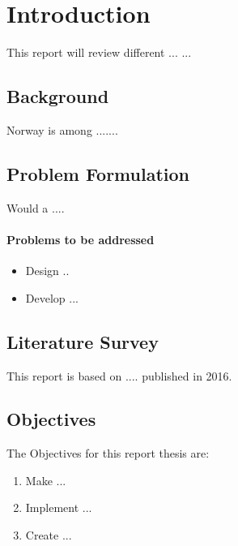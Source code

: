 \chapter[Introductions]{Introduction}

This report will review different ...
...\\

\section{Background}
Norway is among ....... \\




\section{Problem Formulation}
Would a ....
\subsubsection{Problems to be addressed}
\begin{itemize}
\item Design ..
\item Develop ...
\end{itemize}

\section{Literature Survey}
This report is based on ....  published in 2016.
\section{Objectives}
The Objectives for this report thesis are: 
\begin{enumerate}
\item Make ...
\item Implement ...
\item Create ...
\end{enumerate}

